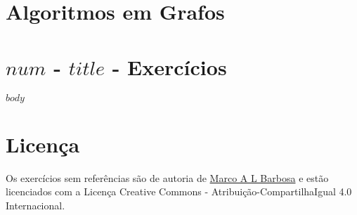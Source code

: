 \documentclass[a4paper,11pt]{article}
\begin{document}
\pagestyle{empty}

\section{Algoritmos em Grafos}

\section{$num$ - $title$ - Exercícios}

$body$

\section{Licença}

\begin{center}
Os exercícios sem referências são de autoria de \href{malbarbo.pro.br}{Marco A
L Barbosa} e estão licenciados com a Licença Creative Commons -
Atribuição-CompartilhaIgual 4.0 Internacional.

\href{http://cieativecommons.org/licenses/by-sa/4.0/}{\ccbysa}
\end{center}
\end{document}
